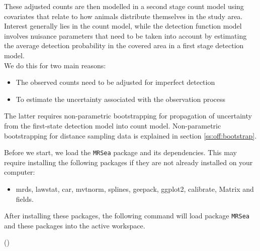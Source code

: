 These adjusted counts are then modelled in a second stage count model using covariates that relate to how animals distribute themselves in the study area. \\

Interest generally lies in the count model, while the detection function model involves nuisance parameters that need to be taken into account by estimating the average detection probability in the covered area in a first stage detection model. \\

We do this for two main reasons:
\begin{itemize}
\item{The observed counts need to be adjusted for imperfect detection}
\item{To estimate the uncertainty associated with the observation process}
\end{itemize}
The latter requires non-parametric bootstrapping for propagation of uncertainty from the first-state detection model into count model. Non-parametric bootstrapping for distance sampling data is explained in section \ref{ss:off:bootstrap}.

\label{sec:mrseadata}
Before we start, we load the {\tt MRSea} package and its dependencies. 
This may require installing the following packages if they are not already installed on your computer: 
\begin{itemize}
\item mrds, lawstat, car, mvtnorm, splines, geepack, ggplot2, calibrate, Matrix and fields.
\end{itemize}
After installing these packages, the following command will load package {\tt MRSea} and these packages into the active workspace. 
\begin{knitrout}\footnotesize
{}\color{fgcolor}
\begin{kframe}
()
\end{kframe}
\end{knitrout}

